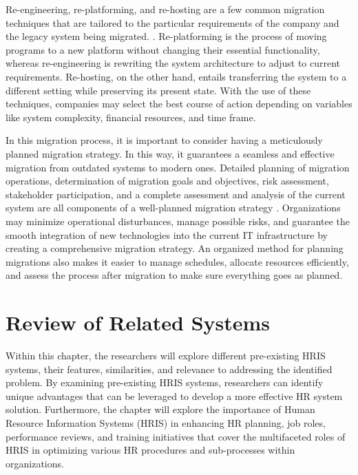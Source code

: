         Re-engineering, re-platforming, and re-hosting are a few common migration techniques that are tailored to the particular requirements of the company and the legacy system being migrated. \cite{hrd12020}. Re-platforming is the process of moving programs to a new platform without changing their essential functionality, whereas re-engineering is rewriting the system architecture to adjust to current requirements. Re-hosting, on the other hand, entails transferring the system to a different setting while preserving its present state. With the use of these techniques, companies may select the best course of action depending on variables like system complexity, financial resources, and time frame.
        
        In this migration process, it is important to consider having a meticulously planned migration strategy. In this way, it guarantees a seamless and effective migration from outdated systems to modern ones. Detailed planning of migration operations, determination of migration goals and objectives, risk assessment, stakeholder participation, and a complete assessment and analysis of the current system are all components of a well-planned migration strategy \cite{hrd12021}. Organizations may minimize operational disturbances, manage possible risks, and guarantee the smooth integration of new technologies into the current IT infrastructure by creating a comprehensive migration strategy. An organized method for planning migrations also makes it easier to manage schedules, allocate resources efficiently, and assess the process after migration to make sure everything goes as planned.



\section{Review of Related Systems}
    Within this chapter, the researchers will explore different pre-existing HRIS systems, their features, similarities, and relevance to addressing the identified problem. By examining pre-existing HRIS systems, researchers can identify unique advantages that can be leveraged to develop a more effective HR system solution. Furthermore, the chapter will explore the importance of Human Resource Information Systems (HRIS) in enhancing HR planning, job roles, performance reviews, and training initiatives that cover the multifaceted roles of HRIS in optimizing various HR procedures and sub-processes within organizations.
    
